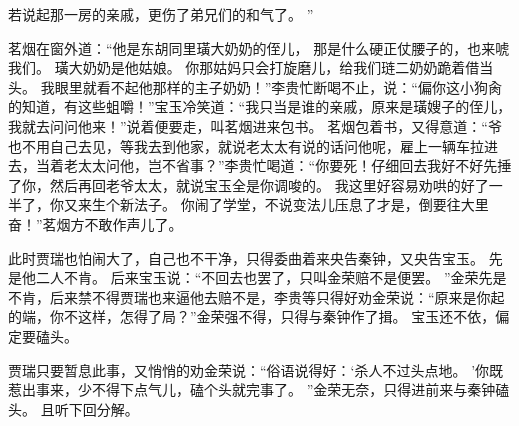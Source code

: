 若说起那一房的亲戚，更伤了弟兄们的和气了。
”\par
茗烟在窗外道：“他是东胡同里璜大奶奶的侄儿，
那是什么硬正仗腰子的，也来唬我们。
璜大奶奶是他姑娘。
你那姑妈只会打旋磨儿，给我们琏二奶奶跪着借当头。
我眼里就看不起他那样的主子奶奶！”李贵忙断喝不止，说：“偏你这小狗肏的知道，有这些蛆嚼！”宝玉冷笑道：“我只当是谁的亲戚，原来是璜嫂子的侄儿，我就去问问他来！”说着便要走，叫茗烟进来包书。
茗烟包着书，又得意道：“爷也不用自己去见，等我去到他家，就说老太太有说的话问他呢，雇上一辆车拉进去，当着老太太问他，岂不省事？”李贵忙喝道：“你要死！仔细回去我好不好先捶了你，然后再回老爷太太，就说宝玉全是你调唆的。
我这里好容易劝哄的好了一半了，你又来生个新法子。
你闹了学堂，不说变法儿压息了才是，倒要往大里奋！”茗烟方不敢作声儿了。
\par
此时贾瑞也怕闹大了，自己也不干净，只得委曲着来央告秦钟，又央告宝玉。
先是他二人不肯。
后来宝玉说：“不回去也罢了，只叫金荣赔不是便罢。
”金荣先是不肯，后来禁不得贾瑞也来逼他去赔不是，李贵等只得好劝金荣说：“原来是你起的端，你不这样，怎得了局？”金荣强不得，只得与秦钟作了揖。
宝玉还不依，偏定要磕头。
\par
贾瑞只要暂息此事，又悄悄的劝金荣说：“俗语说得好：‘杀人不过头点地。
’你既惹出事来，少不得下点气儿，磕个头就完事了。
”金荣无奈，只得进前来与秦钟磕头。
且听下回分解。
\par
